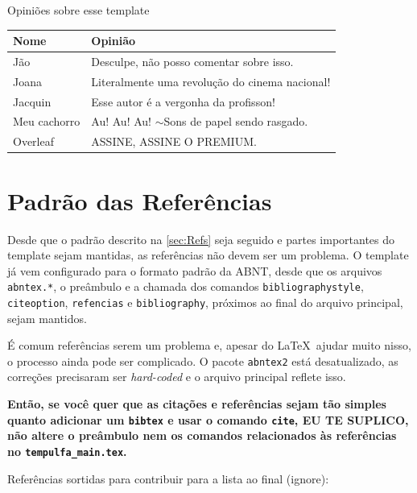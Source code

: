 \begin{quadro}[h]
\centering
\caption{Opiniões sobre esse template}\label{quad:exemplo}
  \begin{tabular}{|l|p{9cm}|}
    \hline 
    \rowcolor[gray]{.9}
    \bf Nome& \bf Opinião\\
    \hline
    Jão& Desculpe, não posso comentar sobre isso.\\
    \hline
    Joana& Literalmente uma revolução do cinema nacional!\\
    \hline
    Jacquin& Esse autor é a vergonha da profisson!\\
    \hline
    Meu cachorro& Au! Au! Au! $\sim$Sons de papel sendo rasgado.\\
    \hline
    Overleaf& ASSINE, ASSINE O PREMIUM.\\
    \hline
    \end{tabular}
    
    \vspace{0.3cm}
\end{quadro}


\section{Padrão das Referências}

Desde que o padrão descrito na \autoref{sec:Refs} seja seguido e partes importantes do template sejam mantidas, as referências não devem ser um problema. O template já vem configurado para o formato padrão da ABNT, desde que os arquivos \texttt{abntex.*}, o preâmbulo e a chamada dos comandos \texttt{bibliographystyle}, \texttt{citeoption}, \texttt{refencias} e \texttt{bibliography}, próximos ao final do arquivo principal, sejam mantidos.

É comum referências serem um problema e, apesar do \LaTeX\ ajudar muito nisso, o processo ainda pode ser complicado. O pacote \texttt{abntex2} está desatualizado, as correções precisaram ser \emph{hard-coded} e o arquivo principal reflete isso.

\textbf{Então, se você quer que as citações e referências sejam tão simples quanto adicionar um \texttt{bibtex} e usar o comando \texttt{cite}, EU TE SUPLICO, não altere o preâmbulo nem os comandos relacionados às referências no \texttt{tempulfa\_main.tex}.}

Referências sortidas para contribuir para a lista ao final (ignore): \cite{Eco1996,Booth2000,BIB2010,Hexsel2004,Franca2001,Gil2002,Porto2002,Silva2005,UFLA:2015,Moura1998,NBR6023:2002,LeGuin:1987}

